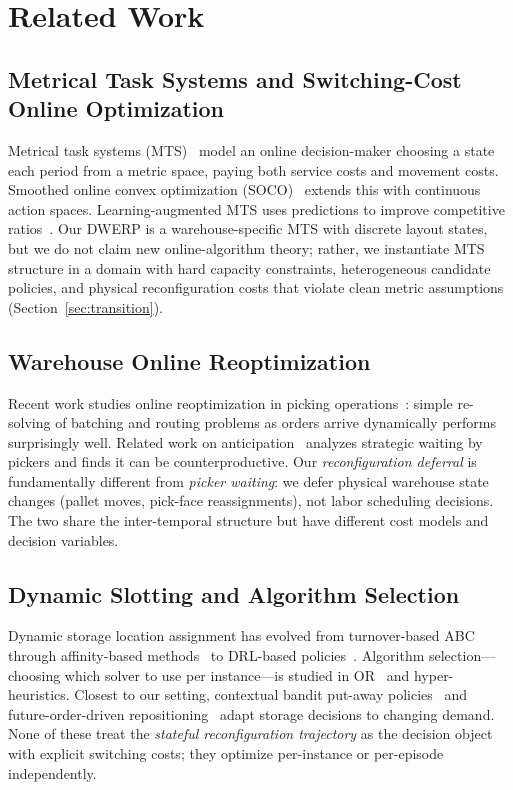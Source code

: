 \documentclass[11pt,a4paper]{article}
\begin{document}
\section{Related Work}\label{sec:related}

\subsection{Metrical Task Systems and Switching-Cost Online Optimization}

Metrical task systems (MTS)~\citep{borodin1992metrical} model an online
decision-maker choosing a state each period from a metric space, paying
both service costs and movement costs. Smoothed online convex optimization
(SOCO)~\citep{goel2009smoothed} extends this with continuous action
spaces. Learning-augmented MTS uses predictions to improve competitive
ratios~\citep{bubeck2021mtses}. Our DWERP is a warehouse-specific MTS with
discrete layout states, but we do not claim new online-algorithm theory;
rather, we instantiate MTS structure in a domain with hard capacity
constraints, heterogeneous candidate policies, and physical
reconfiguration costs that violate clean metric assumptions
(Section~\ref{sec:transition}).

\subsection{Warehouse Online Reoptimization}

Recent work studies online reoptimization in picking
operations~\citep{lorenz2024picking}: simple re-solving of batching and
routing problems as orders arrive dynamically performs surprisingly well.
Related work on anticipation~\citep{lorenz2024anticipation} analyzes
strategic waiting by pickers and finds it can be counterproductive. Our
\emph{reconfiguration deferral} is fundamentally different from
\emph{picker waiting}: we defer physical warehouse state changes (pallet
moves, pick-face reassignments), not labor scheduling decisions. The two
share the inter-temporal structure but have different cost models and
decision variables.

\subsection{Dynamic Slotting and Algorithm Selection}

Dynamic storage location assignment has evolved from turnover-based
ABC~\citep{heskett1963cube} through affinity-based
methods~\citep{kofler2014affinity, mirzaei2022correlated} to DRL-based
policies~\citep{waubert2022drl}. Algorithm selection---choosing which
solver to use per instance---is studied in
OR~\citep{kotsialos2024selection} and hyper-heuristics.
Closest to our setting, contextual bandit put-away
policies~\citep{yuan2024contextual} and future-order-driven
repositioning~\citep{karimi2026keeping} adapt storage decisions to
changing demand. None of these treat the \emph{stateful reconfiguration
trajectory} as the decision object with explicit switching costs; they
optimize per-instance or per-episode independently.
\end{document}
